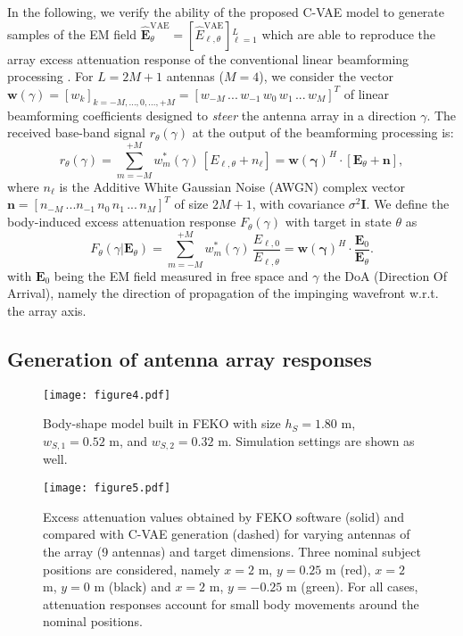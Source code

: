 In the following, we verify the ability of the proposed C-VAE model to generate samples of the EM field $\widehat{\mathcal{\mathbf{E}}}_{\theta}^{\mathrm{VAE}}=\left[\widehat{E}_{\ell,\theta}^{\mathrm{VAE}}\right]{}_{\ell=1}^{L}$ which are able to reproduce the array excess attenuation response of the conventional linear beamforming processing \cite{mimo,benesty-2021}. For $L=2M+1$ antennas ($M=4$), we consider the vector $\mathbf{w}(\gamma)=\left[w_{k}\right]_{k=-M,...,0,...,+M}=\left[w_{-M}\,...\,w_{-1}\,w_{0}\,w_{1}\,...\,w_{M}\right]^{T}$ of linear beamforming coefficients designed to \emph{steer} the antenna array in a direction $\gamma$. The received base-band signal $r_{\theta}(\gamma)$ at the output of the beamforming processing is:
\begin{equation}
r_{\theta}(\gamma)=\sum_{m=-M}^{+M}w_{m}^{*}(\gamma)\,\left[E_{\ell,\theta}+n_{\ell}\right]=\mathbf{w(\gamma)}^{H}\cdot\left[\mathbf{E}_{\theta}+\mathbf{n}\right],\label{eq:beam_forming-1}
\end{equation}
where $n_{\ell}$ is the Additive White Gaussian Noise (AWGN) complex vector $\mathbf{n}=\left[n_{-M}\,...n_{-1}\,n_{0}\,n_{1}\,...\,n_{M}\right]^{T}$ of size $2M+1$, with covariance $\sigma^{2}\mathbf{I}$. We define the body-induced excess attenuation response $F_{\theta}(\gamma)$ with target in state $\theta$ as 
\begin{equation} 
F_{\theta}(\gamma|\mathbf{E}_{\theta})=\sum_{m=-M}^{+M}w_{m}^{*}(\gamma)\,\frac{E_{\ell,0}}{E_{\ell,\theta}}=\mathbf{w(\gamma)}^{H}\cdot\frac{\mathbf{E}_{0}}{\mathbf{E}_{\theta}}.\label{eq:beam_forming-2}
\end{equation}
with $\mathbf{E}_{0}$ being the EM field measured in free space and $\gamma$ the DoA (Direction Of Arrival), namely the direction of propagation of the impinging wavefront w.r.t. the array axis.
 
\subsection{Generation of antenna array responses}
\begin{figure}
\centering \texttt{[image: figure4.pdf]} \protect\caption{\label{anto} Body-shape model built in FEKO\textsuperscript{\textregistered} with size $h_{S}=1.80$ m, $w_{S,1}=0.52$ m, and $w_{S,2}=0.32$ m. Simulation settings are shown as well.}
\end{figure}

\begin{figure}
\centering \texttt{[image: figure5.pdf]} \protect\caption{\label{att} Excess attenuation values obtained by FEKO\textsuperscript{\textregistered} software (solid) and compared with C-VAE generation (dashed) for varying antennas of the array (9 antennas) and target dimensions. Three nominal subject positions are considered, namely $x=2$ m, $y=0.25$ m (red), $x=2$ m, $y=0$ m (black) and $x=2$ m, $y=-0.25$ m (green). For all cases, attenuation responses account for  small body movements around the nominal positions.}
\vspace{-0.2cm}
\end{figure}


